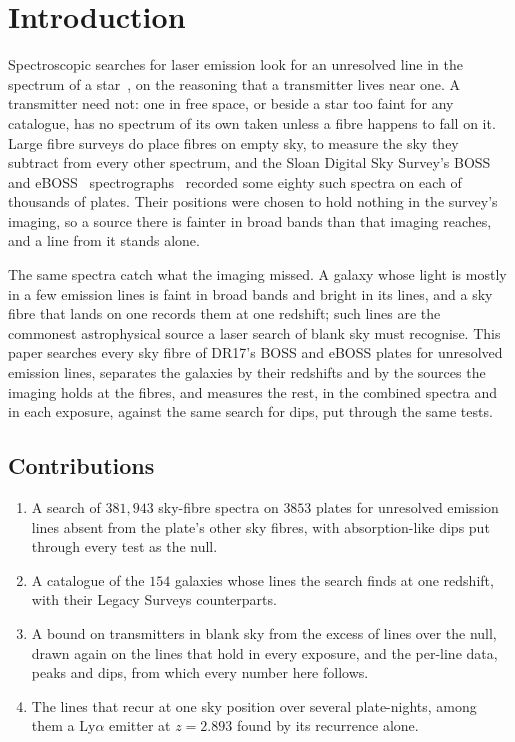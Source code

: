 \documentclass[3p,11pt]{elsarticle}
\begin{document}
\section{Introduction}\label{sec:intro}

Spectroscopic searches for laser emission look for an unresolved line in the spectrum
of a star~\cite{ReinesMarcy2002,TellisMarcy2017}, on the reasoning that a transmitter
lives near one. A transmitter need not: one in free space, or beside a star too faint
for any catalogue, has no spectrum of its own taken unless a fibre happens to fall on
it. Large fibre surveys do place fibres on empty sky, to measure the sky they subtract
from every other spectrum, and the Sloan Digital Sky Survey's BOSS~\cite{Dawson2013} and
eBOSS~\cite{Dawson2016} spectrographs~\cite{Smee2013} recorded some eighty such
spectra on each of thousands of plates. Their positions were chosen to hold nothing in
the survey's imaging, so a source there is fainter in broad bands than that imaging
reaches, and a line from it stands alone.

The same spectra catch what the imaging missed. A galaxy whose light is mostly in a few
emission lines is faint in broad bands and bright in its lines, and a sky fibre that
lands on one records them at one redshift; such lines are the commonest astrophysical
source a laser search of blank sky must recognise. This paper searches every sky fibre
of DR17's BOSS and eBOSS plates for unresolved emission lines, separates the galaxies by
their redshifts and by the sources the imaging holds at the fibres, and measures the rest,
in the combined spectra and in each exposure, against the same search for dips, put
through the same tests.

\subsection{Contributions}
\begin{enumerate}[leftmargin=*,itemsep=1pt]
\item A search of $381{,}943$ sky-fibre spectra on $3853$ plates for unresolved emission
lines absent from the plate's other sky fibres, with absorption-like dips put through
every test as the null.
\item A catalogue of the $154$ galaxies whose lines the search finds at one redshift,
with their Legacy Surveys counterparts.
\item A bound on transmitters in blank sky from the excess of lines over the null, drawn
again on the lines that hold in every exposure, and the per-line data, peaks and dips,
from which every number here follows.
\item The lines that recur at one sky position over several plate-nights, among them a
Ly$\alpha$ emitter at $z=2.893$ found by its recurrence alone.
\end{enumerate}
\end{document}
